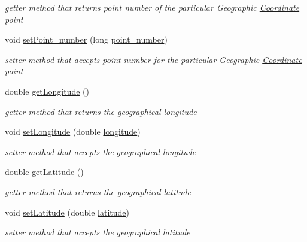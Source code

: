 \begin{DoxyCompactItemize}
\begin{DoxyCompactList}\small\item\em getter method that returns point number of the particular Geographic \hyperlink{classcoordinates_1_1_coordinate}{Coordinate} point \end{DoxyCompactList}\item 
void \hyperlink{classcoordinates_1_1_geographic_coordinate_a60674b3195f4470485e62005e90eb141}{set\+Point\+\_\+number} (long \hyperlink{classcoordinates_1_1_geographic_coordinate_a7d7384b678b1b189a8a023653f9d3c19}{point\+\_\+number})
\begin{DoxyCompactList}\small\item\em setter method that accepts point number for the particular Geographic \hyperlink{classcoordinates_1_1_coordinate}{Coordinate} point \end{DoxyCompactList}\item 
double \hyperlink{classcoordinates_1_1_geographic_coordinate_a1f6aea00058a08a23191930436cb5ef7}{get\+Longitude} ()
\begin{DoxyCompactList}\small\item\em getter method that returns the geographical longitude \end{DoxyCompactList}\item 
void \hyperlink{classcoordinates_1_1_geographic_coordinate_a72cfb2c3bcafcee1eff0da6b8e9da8fb}{set\+Longitude} (double \hyperlink{classcoordinates_1_1_geographic_coordinate_a1ffbbfc5c01ab766af1d32bcc8cb42ad}{longitude})
\begin{DoxyCompactList}\small\item\em setter method that accepts the geographical longitude \end{DoxyCompactList}\item 
double \hyperlink{classcoordinates_1_1_geographic_coordinate_a7c030f592a3644f178c07d79b89382a0}{get\+Latitude} ()
\begin{DoxyCompactList}\small\item\em getter method that returns the geographical latitude \end{DoxyCompactList}\item 
void \hyperlink{classcoordinates_1_1_geographic_coordinate_a8baf5c2c81a9cd60ca73f74d63509775}{set\+Latitude} (double \hyperlink{classcoordinates_1_1_geographic_coordinate_a07a18abcc3cd691d4d8821a875dabbd6}{latitude})
\begin{DoxyCompactList}\small\item\em setter method that accepts the geographical latitude \end{DoxyCompactList}\item 

\end{DoxyCompactItemize}
